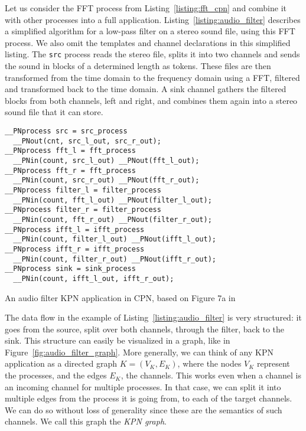 Let us consider the \acs{FFT} process from Listing~\ref{listing:fft_cpn} and combine it with other processes into a full application.
Listing~\ref{listing:audio_filter} describes a simplified algorithm for a low-pass filter on a stereo sound file, using this \acs{FFT} process.
We also omit the templates and channel declarations in this simplified listing.
The \texttt{src} process reads the stereo file, splits it into two channels and sends the sound in blocks of a determined length as tokens.
These files are then transformed from the time domain to the frequency domain using a \acf{FFT}, filtered and transformed back to the time domain.
A sink channel gathers the filtered blocks from both channels, left and right, and combines them again into a stereo sound file that it can store.

\begin{listing}
\begin{verbatim}
__PNprocess src = src_process
  __PNout(cnt, src_l_out, src_r_out);
__PNprocess fft_l = fft_process
  __PNin(count, src_l_out) __PNout(fft_l_out);
__PNprocess fft_r = fft_process
  __PNin(count, src_r_out) __PNout(fft_r_out);
__PNprocess filter_l = filter_process
  __PNin(count, fft_l_out) __PNout(filter_l_out);
__PNprocess filter_r = filter_process
  __PNin(count, fft_r_out) __PNout(filter_r_out);
__PNprocess ifft_l = ifft_process
  __PNin(count, filter_l_out) __PNout(ifft_l_out);
__PNprocess ifft_r = ifft_process
  __PNin(count, filter_r_out) __PNout(ifft_r_out);
__PNprocess sink = sink_process
  __PNin(count, ifft_l_out, ifft_r_out);
\end{verbatim}
\caption{An audio filter \ac{KPN} application in \ac{CPN}, based on Figure 7a in \cite{cpn}}
\label{listing:audio_filter}
\end{listing}

The data flow in the example of Listing~\ref{listing:audio_filter} is very structured: it goes from the source, split over both channels, through the filter, back to the sink.
This structure can easily be visualized in a graph, like in Figure~\ref{fig:audio_filter_graph}.
More generally, we can think of any \ac{KPN} application as a directed graph $K = (V_K,E_K)$, where the nodes $V_K$ represent the processes, and the edges $E_K$, the channels.
This works even when a channel is an incoming channel for multiple processes.
In that case, we can split it into multiple edges from the process it is going from, to each of the target channels.
We can do so without loss of generality since these are the semantics of such channels. 
We call this graph the \emph{\ac{KPN} graph}.

